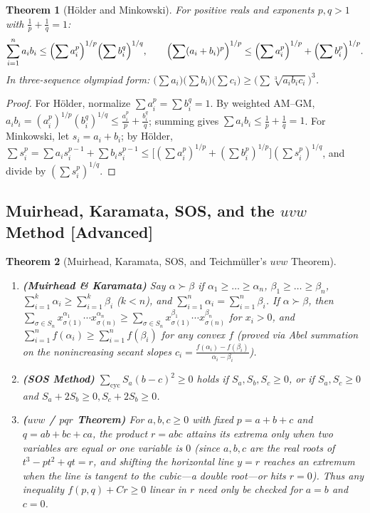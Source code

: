 \documentclass[11pt]{article}
\theoremstyle{plain}
\newtheorem{theorem}{Theorem}[section]
\theoremstyle{definition}
\begin{document}
\begin{theorem}[Hölder and Minkowski]
For positive reals and exponents $p, q > 1$ with $\frac1p + \frac1q = 1$:
\[
\sum_{i=1}^n a_i b_i \le \Bigl(\sum a_i^p\Bigr)^{1/p}\Bigl(\sum b_i^q\Bigr)^{1/q}, \qquad
\Bigl(\sum (a_i+b_i)^p\Bigr)^{1/p} \le \Bigl(\sum a_i^p\Bigr)^{1/p} + \Bigl(\sum b_i^p\Bigr)^{1/p}.
\]
In three-sequence olympiad form: $\bigl(\sum a_i\bigr)\bigl(\sum b_i\bigr)\bigl(\sum c_i\bigr) \ge \bigl(\sum \sqrt[3]{a_i b_i c_i}\bigr)^3$.
\end{theorem}
\begin{proof}
For Hölder, normalize $\sum a_i^p = \sum b_i^q = 1$. By weighted AM--GM,
$a_i b_i = (a_i^p)^{1/p}(b_i^q)^{1/q} \le \frac{a_i^p}{p} + \frac{b_i^q}{q}$;
summing gives $\sum a_ib_i \le \frac1p + \frac1q = 1$. For Minkowski, let $s_i = a_i+b_i$; by Hölder,
$\sum s_i^p = \sum a_i s_i^{p-1} + \sum b_i s_i^{p-1} \le \bigl[(\sum a_i^p)^{1/p} + (\sum b_i^p)^{1/p}\bigr](\sum s_i^p)^{1/q}$, and divide by $(\sum s_i^p)^{1/q}$.
\end{proof}

\subsection{Muirhead, Karamata, SOS, and the \texorpdfstring{$uvw$}{uvw} Method [Advanced]}

\begin{theorem}[Muirhead, Karamata, SOS, and Teichmüller's $uvw$ Theorem]
\leavevmode
\begin{enumerate}[label=(\alph*)]
\item \textbf{(Muirhead \& Karamata)} Say $\alpha \succ \beta$ if $\alpha_1\ge\dots\ge\alpha_n$, $\beta_1\ge\dots\ge\beta_n$, $\sum_{i=1}^k \alpha_i \ge \sum_{i=1}^k \beta_i$ ($k<n$), and $\sum_{i=1}^n \alpha_i = \sum_{i=1}^n \beta_i$. If $\alpha \succ \beta$, then $\sum_{\sigma\in S_n} x_{\sigma(1)}^{\alpha_1}\cdots x_{\sigma(n)}^{\alpha_n} \ge \sum_{\sigma\in S_n} x_{\sigma(1)}^{\beta_1}\cdots x_{\sigma(n)}^{\beta_n}$ for $x_i > 0$, and $\sum_{i=1}^n f(\alpha_i) \ge \sum_{i=1}^n f(\beta_i)$ for any convex $f$ (proved via Abel summation on the nonincreasing secant slopes $c_i = \frac{f(\alpha_i)-f(\beta_i)}{\alpha_i-\beta_i}$).
\item \textbf{(SOS Method)} $\sum_{\text{cyc}} S_a(b-c)^2 \ge 0$ holds if $S_a, S_b, S_c \ge 0$, or if $S_a, S_c \ge 0$ and $S_a + 2S_b \ge 0, S_c + 2S_b \ge 0$.
\item \textbf{($uvw$ / $pqr$ Theorem)} For $a,b,c \ge 0$ with fixed $p = a+b+c$ and $q = ab+bc+ca$, the product $r = abc$ attains its extrema only when \emph{two variables are equal} or \emph{one variable is $0$} (since $a,b,c$ are the real roots of $t^3 - pt^2 + qt = r$, and shifting the horizontal line $y=r$ reaches an extremum when the line is tangent to the cubic—a double root—or hits $r=0$). Thus any inequality $f(p,q) + Cr \ge 0$ linear in $r$ need only be checked for $a=b$ and $c=0$.
\end{enumerate}
\end{theorem}
\end{document}
